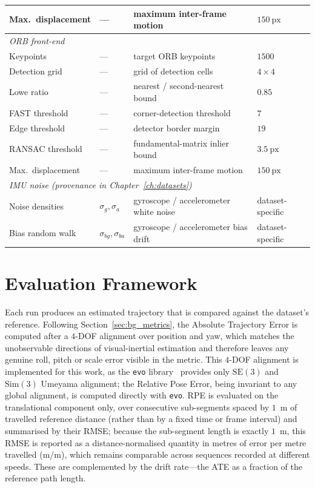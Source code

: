 \begin{table}[htbp]
\begin{tabular}{llll}
Max.\ displacement    & ---                   & maximum inter-frame motion                   & $150~\mathrm{px}$ \\
\midrule
\multicolumn{4}{l}{\emph{ORB front-end}} \\
Keypoints             & ---                   & target ORB keypoints                         & $1500$ \\
Detection grid        & ---                   & grid of detection cells                      & $4 \times 4$ \\
Lowe ratio            & ---                   & nearest / second-nearest bound               & $0.85$ \\
FAST threshold        & ---                   & corner-detection threshold                   & $7$ \\
Edge threshold        & ---                   & detector border margin                       & $19$ \\
RANSAC threshold      & ---                   & fundamental-matrix inlier bound              & $3.5~\mathrm{px}$ \\
Max.\ displacement    & ---                   & maximum inter-frame motion                   & $150~\mathrm{px}$ \\
\midrule
\multicolumn{4}{l}{\emph{IMU noise (provenance in Chapter~\ref{ch:datasets})}} \\
Noise densities       & $\sigma_g, \sigma_a$    & gyroscope / accelerometer white noise        & dataset-specific \\
Bias random walk      & $\sigma_{bg}, \sigma_{ba}$ & gyroscope / accelerometer bias drift      & dataset-specific \\
\bottomrule
\end{tabular}
\end{table}

\section{Evaluation Framework}
\label{sec:m_eval}
Each run produces an estimated trajectory that is compared against the dataset's reference. Following Section~\ref{sec:bg_metrics}, the Absolute Trajectory Error is computed after a $4$-DOF alignment over position and yaw, which matches the unobservable directions of visual-inertial estimation and therefore leaves any genuine roll, pitch or scale error visible in the metric. This $4$-DOF alignment is implemented for this work, as the \texttt{evo} library~\cite{Grupp_2017} provides only $\mathrm{SE}(3)$ and $\mathrm{Sim}(3)$ Umeyama alignment; the Relative Pose Error, being invariant to any global alignment, is computed directly with \texttt{evo}. RPE is evaluated on the translational component only, over consecutive sub-segments spaced by $1$~m of travelled reference distance (rather than by a fixed time or frame interval) and summarised by their RMSE; because the sub-segment length is exactly $1$~m, this RMSE is reported as a distance-normalised quantity in metres of error per metre travelled (m/m), which remains comparable across sequences recorded at different speeds. These are complemented by the drift rate---the ATE as a fraction of the reference path length.

